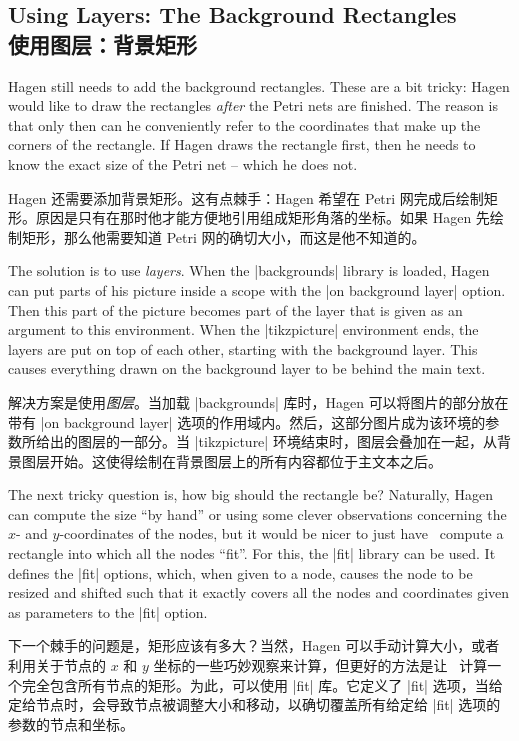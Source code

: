 

\subsection{Using Layers: The Background Rectangles\\使用图层：背景矩形}

Hagen still needs to add the background rectangles. These are a bit tricky:
Hagen would like to draw the rectangles \emph{after} the Petri nets are
finished. The reason is that only then can he conveniently refer to the
coordinates that make up the corners of the rectangle. If Hagen draws the
rectangle first, then he needs to know the exact size of the Petri net -- which
he does not.

Hagen 还需要添加背景矩形。这有点棘手：Hagen 希望在 Petri 网完成后绘制矩形。原因是只有在那时他才能方便地引用组成矩形角落的坐标。如果 Hagen 先绘制矩形，那么他需要知道 Petri 网的确切大小，而这是他不知道的。

The solution is to use \emph{layers}. When the |backgrounds| library is loaded,
Hagen can put parts of his picture inside a scope with the
|on background layer| option. Then this part of the picture becomes part of the
layer that is given as an argument to this environment. When the
|{tikzpicture}| environment ends, the layers are put on top of each other,
starting with the background layer. This causes everything drawn on the
background layer to be behind the main text.

解决方案是使用\emph{图层}。当加载 |backgrounds| 库时，Hagen 可以将图片的部分放在带有 |on background layer| 选项的作用域内。然后，这部分图片成为该环境的参数所给出的图层的一部分。当 |{tikzpicture}| 环境结束时，图层会叠加在一起，从背景图层开始。这使得绘制在背景图层上的所有内容都位于主文本之后。


The next tricky question is, how big should the rectangle be? Naturally, Hagen
can compute the size ``by hand'' or using some clever observations concerning
the $x$- and $y$-coordinates of the nodes, but it would be nicer to just have
\tikzname\ compute a rectangle into which all the nodes ``fit''. For this, the
|fit| library can be used. It defines the |fit| options, which, when given to a
node, causes the node to be resized and shifted such that it exactly covers all
the nodes and coordinates given as parameters to the |fit| option.

下一个棘手的问题是，矩形应该有多大？当然，Hagen 可以手动计算大小，或者利用关于节点的 $x$ 和 $y$ 坐标的一些巧妙观察来计算，但更好的方法是让 \tikzname\ 计算一个完全包含所有节点的矩形。为此，可以使用 |fit| 库。它定义了 |fit| 选项，当给定给节点时，会导致节点被调整大小和移动，以确切覆盖所有给定给 |fit| 选项的参数的节点和坐标。

